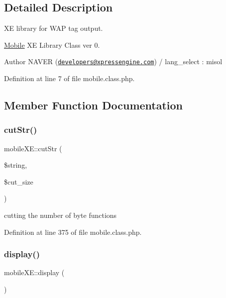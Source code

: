 \subsection{Detailed Description}
XE library for W\+AP tag output. 

\hyperlink{classMobile}{Mobile} XE Library Class ver 0. \begin{DoxyAuthor}{Author}
N\+A\+V\+ER (\href{mailto:developers@xpressengine.com}{\tt developers@xpressengine.\+com}) / lang\+\_\+select \+: misol 
\end{DoxyAuthor}


Definition at line 7 of file mobile.\+class.\+php.



\subsection{Member Function Documentation}
\mbox{\label{classmobileXE_acd2dd9d14993324440b01d94be13e818}} 
\subsubsection{\texorpdfstring{cut\+Str()}{cutStr()}}
{\footnotesize\ttfamily mobile\+X\+E\+::cut\+Str (\begin{DoxyParamCaption}\item[{}]{\$string,  }\item[{}]{\$cut\+\_\+size }\end{DoxyParamCaption})}



cutting the number of byte functions 



Definition at line 375 of file mobile.\+class.\+php.

\mbox{\label{classmobileXE_aff665dae76909bd7876038802e4d001f}} 
\subsubsection{\texorpdfstring{display()}{display()}}
{\footnotesize\ttfamily mobile\+X\+E\+::display (\begin{DoxyParamCaption}{ }\end{DoxyParamCaption})}



